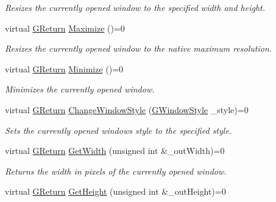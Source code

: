 \begin{DoxyCompactItemize}
\begin{DoxyCompactList}\small\item\em Resizes the currently opened window to the specified width and height. \end{DoxyCompactList}\item 
virtual \mbox{\hyperlink{namespace_g_w_a67a839e3df7ea8a5c5686613a7a3de21}{G\+Return}} \mbox{\hyperlink{class_g_w_1_1_s_y_s_t_e_m_1_1_g_window_a06b5f092e742baca82a0bfc2cbaef153}{Maximize}} ()=0
\begin{DoxyCompactList}\small\item\em Resizes the currently opened window to the native maximum resolution. \end{DoxyCompactList}\item 
virtual \mbox{\hyperlink{namespace_g_w_a67a839e3df7ea8a5c5686613a7a3de21}{G\+Return}} \mbox{\hyperlink{class_g_w_1_1_s_y_s_t_e_m_1_1_g_window_a2cced61a323dac10535904c3899563d8}{Minimize}} ()=0
\begin{DoxyCompactList}\small\item\em Minimizes the currently opened window. \end{DoxyCompactList}\item 
virtual \mbox{\hyperlink{namespace_g_w_a67a839e3df7ea8a5c5686613a7a3de21}{G\+Return}} \mbox{\hyperlink{class_g_w_1_1_s_y_s_t_e_m_1_1_g_window_a21533c58e920d347c377ebdaa6d2b76f}{Change\+Window\+Style}} (\mbox{\hyperlink{namespace_g_w_1_1_s_y_s_t_e_m_ad117891e556631f842625c348d36a071}{G\+Window\+Style}} \+\_\+style)=0
\begin{DoxyCompactList}\small\item\em Sets the currently opened window\textquotesingle{}s style to the specified style. \end{DoxyCompactList}\item 
virtual \mbox{\hyperlink{namespace_g_w_a67a839e3df7ea8a5c5686613a7a3de21}{G\+Return}} \mbox{\hyperlink{class_g_w_1_1_s_y_s_t_e_m_1_1_g_window_a75672fb359ee44c5e551ee6223a10bdb}{Get\+Width}} (unsigned int \&\+\_\+out\+Width)=0
\begin{DoxyCompactList}\small\item\em Returns the width in pixels of the currently opened window. \end{DoxyCompactList}\item 
virtual \mbox{\hyperlink{namespace_g_w_a67a839e3df7ea8a5c5686613a7a3de21}{G\+Return}} \mbox{\hyperlink{class_g_w_1_1_s_y_s_t_e_m_1_1_g_window_aab8f7e74d8554f309a7785216ff89ff3}{Get\+Height}} (unsigned int \&\+\_\+out\+Height)=0

\end{DoxyCompactItemize}
